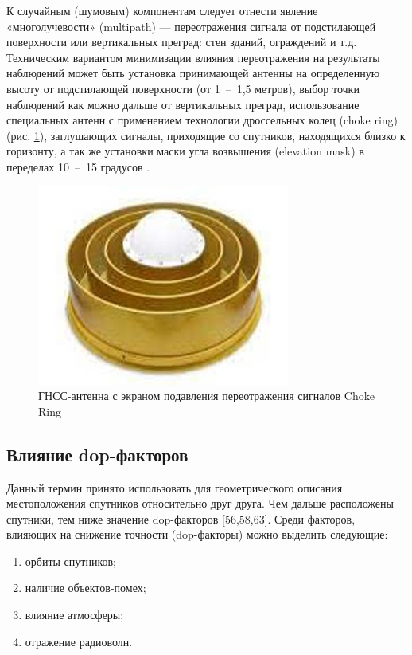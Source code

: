 К случайным (шумовым) компонентам следует отнести явление «многолучевости» (multipath) --- переотражения сигнала от подстилающей поверхности или вертикальных преград: стен зданий, ограждений и т.д. Техническим вариантом минимизации влияния переотражения на результаты наблюдений может быть установка принимающей антенны на определенную высоту от подстилающей поверхности (от 1~--~1,5 метров), выбор точки наблюдений как можно дальше от вертикальных преград, использование специальных антенн с применением технологии дроссельных колец (choke ring) (рис. \cref{fig:pic05}), заглушающих сигналы, приходящие со спутников, находящихся близко к горизонту, а так же установки маски угла возвышения (elevation mask) в переделах 10~--~15 градусов \cite{src53}.
\begin{figure}[h]
	\centering
	\includegraphics[width=0.7\linewidth]{images/pic05}
	\caption[ГНСС-антенна Choke Ring]{ГНСС-антенна с экраном подавления переотражения сигналов Choke Ring}
	\label{fig:pic05}
\end{figure}



\subsection{Влияние dop-факторов}\label{subsec:ch1/sec3/sub7}

Данный термин принято использовать для геометрического описания местоположения спутников относительно друг друга. Чем дальше расположены спутники, тем ниже значение dop-факторов \cite{src56, src58, src63} [56,58,63]. Среди факторов, влияющих на снижение точности (dop-факторы) можно выделить следующие:
\begin{enumerate}
	\item орбиты спутников;
	\item наличие объектов-помех;
	\item влияние атмосферы;
	\item отражение радиоволн.
\end{enumerate} 

